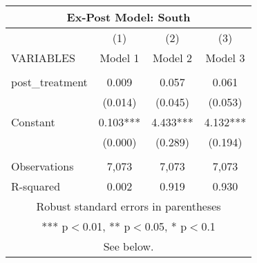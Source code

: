 \begin{tabular}{lccc}
\multicolumn{4}{c}{Ex-Post Model: South} \\ \hline
 & (1) & (2) & (3) \\
VARIABLES & Model 1 & Model 2 & Model 3 \\ \hline
 &  &  &  \\
post\_treatment & 0.009 & 0.057 & 0.061 \\
 & (0.014) & (0.045) & (0.053) \\
Constant & 0.103*** & 4.433*** & 4.132*** \\
 & (0.000) & (0.289) & (0.194) \\
 &  &  &  \\
Observations & 7,073 & 7,073 & 7,073 \\
 R-squared & 0.002 & 0.919 & 0.930 \\ \hline
\multicolumn{4}{c}{ Robust standard errors in parentheses} \\
\multicolumn{4}{c}{ *** p$<$0.01, ** p$<$0.05, * p$<$0.1} \\
\multicolumn{4}{c}{ See below.} \\
\end{tabular}
